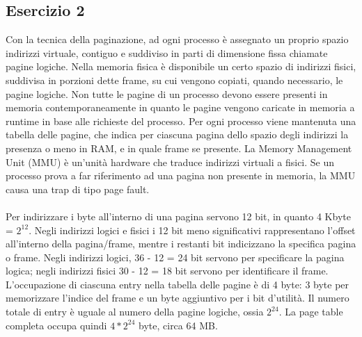 \documentclass[12pt]{article}
\begin{document}
\subsection*{Esercizio 2}
Con la tecnica della paginazione, ad ogni processo è assegnato un proprio spazio indirizzi virtuale, contiguo e suddiviso 
in parti di dimensione fissa chiamate pagine logiche. Nella memoria fisica è disponibile un certo spazio di indirizzi 
fisici, suddivisa in porzioni dette frame, su cui vengono copiati, quando necessario, le pagine logiche. Non tutte le 
pagine di un processo devono essere presenti in memoria contemporaneamente in quanto le pagine vengono caricate in 
memoria a runtime in base alle richieste del processo. Per ogni processo viene mantenuta una tabella delle pagine, che 
indica per ciascuna pagina dello spazio degli indirizzi la presenza o meno in RAM, e in quale frame se presente. 
La Memory Management Unit (MMU) è un'unità hardware che traduce indirizzi virtuali a fisici. Se un processo prova a far 
riferimento ad una pagina non presente in memoria, la MMU causa una trap di tipo page fault.\\\\
Per indirizzare i byte all'interno di una pagina servono 12 bit, in quanto 4 Kbyte = $2^{12}$. Negli indirizzi logici e 
fisici i 12 bit meno significativi rappresentano l'offset all'interno della pagina/frame, mentre i restanti bit indicizzano 
la specifica pagina o frame. Negli indirizzi logici, 36 - 12 = 24 bit servono per specificare la pagina logica; negli 
indirizzi fisici 30 - 12 = 18 bit servono per identificare il frame. L'occupazione di ciascuna entry nella tabella delle 
pagine è di 4 byte: 3 byte per memorizzare l'indice del frame e un byte aggiuntivo per i bit d'utilità. Il numero totale 
di entry è uguale al numero della pagine logiche, ossia $2^{24}$. La page table completa occupa quindi $4*2^{24}$ byte, 
circa 64 MB.
\end{document}
